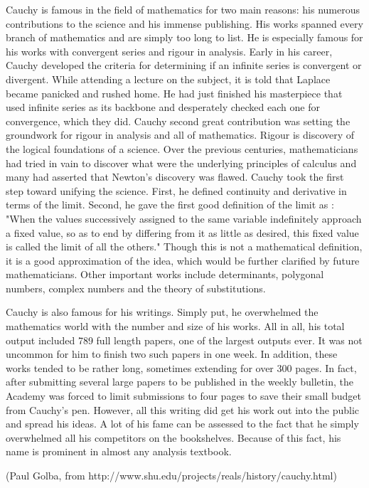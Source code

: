 Cauchy is famous in the field of mathematics for two main reasons: his numerous
contributions to the science and his immense publishing. His works spanned every
branch of mathematics and are simply too long to list. He is especially famous
for his works with convergent series and rigour in analysis. Early in his
career, Cauchy developed the criteria for determining if an infinite series is
convergent or divergent. While attending a lecture on the subject, it is told
that Laplace became panicked and rushed home. He had just finished his
masterpiece that used infinite series as its backbone and desperately checked
each one for convergence, which they did. Cauchy second great contribution was
setting the groundwork for rigour in analysis and all of mathematics. Rigour is
discovery of the logical foundations of a science. Over the previous centuries,
mathematicians had tried in vain to discover what were the underlying principles
of calculus and many had asserted that Newton's discovery was flawed. Cauchy
took the first step toward unifying the science. First, he defined continuity
and derivative in terms of the limit. Second, he gave the first good definition
of the limit as : "When the values successively assigned to the same variable
indefinitely approach a fixed value, so as to end by differing from it as little
as desired, this fixed value is called the limit of all the others." Though this
is not a mathematical definition, it is a good approximation of the idea, which
would be further clarified by future mathematicians. Other important works
include determinants, polygonal numbers, complex numbers and the theory of
substitutions.


Cauchy is also famous for his writings. Simply put, he overwhelmed the
mathematics world with the number and size of his works. All in all, his total
output included 789 full length papers, one of the largest outputs ever. It was
not uncommon for him to finish two such papers in one week. In addition, these
works tended to be rather long, sometimes extending for over 300 pages. In fact,
after submitting several large papers to be published in the weekly bulletin,
the Academy was forced to limit submissions to four pages to save their small
budget from Cauchy's pen. However, all this writing did get his work out into
the public and spread his ideas. A lot of his fame can be assessed to the fact
that he simply overwhelmed all his competitors on the bookshelves. Because of
this fact, his name is prominent in almost any analysis textbook.

(Paul Golba, from http://www.shu.edu/projects/reals/history/cauchy.html)
